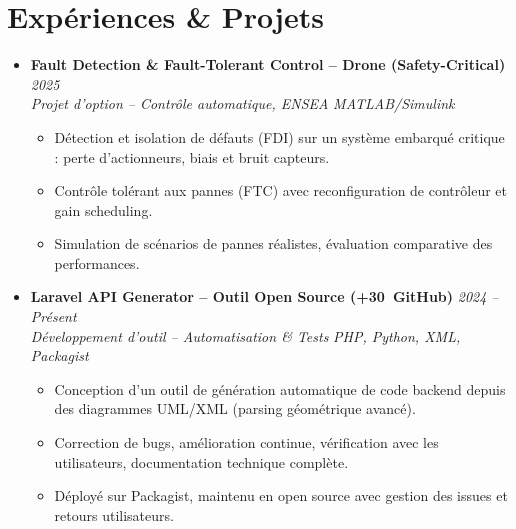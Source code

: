 \documentclass[a4paper,11pt]{article}
\begin{document}
\section{Expériences \& Projets}
\begin{itemize}[leftmargin=*, label={-}]

\item \textbf{Fault Detection \& Fault-Tolerant Control -- Drone (Safety-Critical)} \hfill \textit{2025} \\
\textit{Projet d'option -- Contrôle automatique, ENSEA} \hfill \textit{MATLAB/Simulink}
\vspace{-2pt}
    \begin{itemize}[leftmargin=0.4cm, nosep, label=\tiny$\bullet$]
        \item \small{Détection et isolation de défauts (FDI) sur un système embarqué critique : perte d'actionneurs, biais et bruit capteurs.}
        \item \small{Contrôle tolérant aux pannes (FTC) avec reconfiguration de contrôleur et gain scheduling.}
        \item \small{Simulation de scénarios de pannes réalistes, évaluation comparative des performances.}
    \end{itemize}
\vspace{3pt}

\item \textbf{Laravel API Generator -- Outil Open Source (+30\faStarHalf\ GitHub)} \hfill \textit{2024 -- Présent} \\
\textit{Développement d'outil -- Automatisation \& Tests} \hfill \textit{PHP, Python, XML, Packagist}
\vspace{-2pt}
    \begin{itemize}[leftmargin=0.4cm, nosep, label=\tiny$\bullet$]
        \item \small{Conception d'un outil de génération automatique de code backend depuis des diagrammes UML/XML (parsing géométrique avancé).}
        \item \small{Correction de bugs, amélioration continue, vérification avec les utilisateurs, documentation technique complète.}
        \item \small{Déployé sur Packagist, maintenu en open source avec gestion des issues et retours utilisateurs.}
    \end{itemize}
\vspace{3pt}


\end{itemize}
\end{document}
